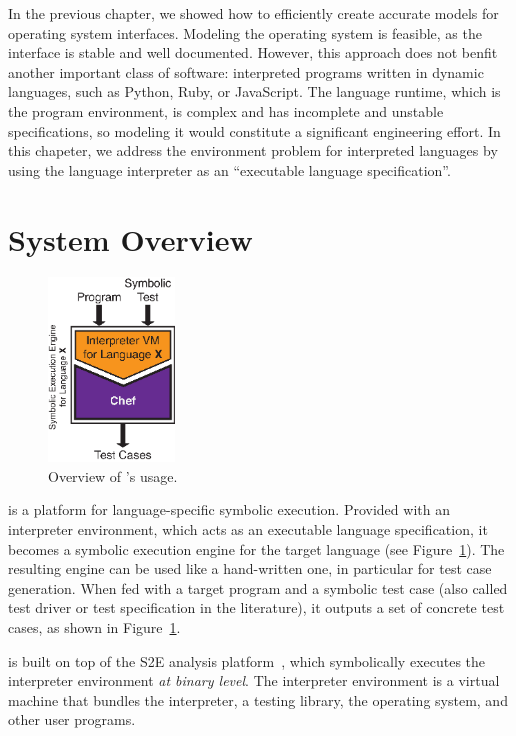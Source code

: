 In the previous chapter, we showed how to efficiently create accurate models for operating system interfaces.  Modeling the operating system is feasible, as the interface is stable and well documented.
%
However, this approach does not benfit another important class of software: interpreted programs written in dynamic languages, such as Python, Ruby, or JavaScript.
%
The language runtime, which is the program environment, is complex and has incomplete and unstable specifications, so modeling it would constitute a significant engineering effort.
%
In this chapeter, we address the environment problem for interpreted languages by using the language interpreter as an ``executable language specification''.

\section{System Overview}

\begin{figure}
  \centering
  \includegraphics[width=0.3\textwidth]{figures/chef/usage-model}
  \caption{Overview of \chef's usage.}
  \label{fig:chef:overview}
\end{figure}

\chef is a platform for language-specific symbolic execution.
%
Provided with an interpreter environment, which acts as an executable language specification, it becomes a symbolic execution engine for the target language (see Figure~\ref{fig:chef:overview}).
%
The resulting engine can be used like a hand-written one, in particular for test case generation.  When fed with a target program and a symbolic test case (also called test driver or test specification in the literature), it outputs a set of concrete test cases, as shown in Figure~\ref{fig:chef:overview}.

\chef is built on top of the S2E analysis platform~\cite{s2eSystem}, which symbolically executes the interpreter environment \emph{at binary level}.
%
The interpreter environment is a virtual machine that bundles the interpreter, a testing library, the operating system, and other user programs.

